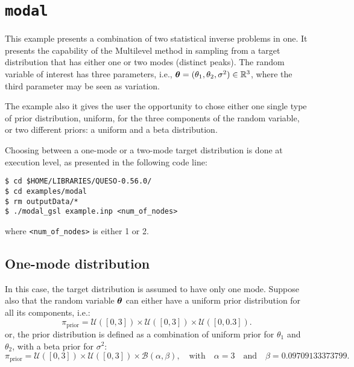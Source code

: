\section{\texttt{modal}}\label{sec:example_modal}


This example presents a combination of two statistical inverse problems in one. 
It presents the capability of the Multilevel method in sampling from a target distribution that has either one or two modes (distinct peaks). The random variable of interest has three parameters, i.e., $\mbox{\boldmath$ \theta $}=(\theta_1,\theta_2, \sigma^2) \in \mathbb{R}^3$, where the third parameter may be seen as variation.

The example also it gives the user the opportunity to chose either one single type of prior distribution, uniform, for the three components of the random variable, or two different priors: a uniform and a beta distribution.

Choosing between a one-mode or a two-mode target distribution is done at execution level, as presented in the following code line:

\begin{lstlisting}[label={},caption={}]
$ cd $HOME/LIBRARIES/QUESO-0.56.0/
$ cd examples/modal
$ rm outputData/*
$ ./modal_gsl example.inp <num_of_nodes>
\end{lstlisting}
where \verb+<num_of_nodes>+ is either 1 or 2.
% 
% 
% 
% 
% 
% 
% 
% 
\subsection{One-mode distribution}

In this case, the target distribution is assumed to have only one mode.
Suppose also that the random variable $\mbox{\boldmath$ \theta $}$  can either have a uniform prior distribution for all its components, i.e.:
$$
\pi_{\text{prior}}=\mathcal{U}([0,3]) \times \mathcal{U}([0,3]) \times \mathcal{U}([0,0.3]).
$$
or, the prior distribution is defined as a combination of uniform prior for $\theta_1$ and $\theta_2$, with a beta prior for $\sigma^2$:
$$
\pi_{\text{prior}}=\mathcal{U}([0,3]) \times \mathcal{U}([0,3]) \times \mathcal{B}(\alpha,\beta), \quad \text{with} \quad \alpha=3 \quad\text{and}\quad \beta=0.09709133373799.
$$

